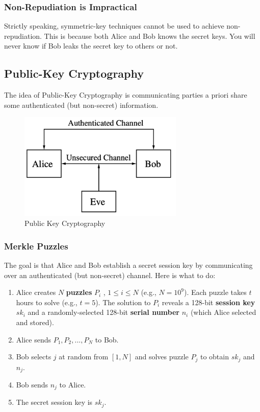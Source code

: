 \documentclass[12pt,titlepage]{article}
\begin{document}
\subsubsection{Non-Repudiation is Impractical}
Strictly speaking, symmetric-key techniques cannot be used to achieve non-repudiation. This is because both Alice and Bob knows the secret keys. You will never know if Bob leaks the secret key to others or not. 
\subsection{Public-Key Cryptography}
The idea of Public-Key Cryptography is communicating parties a priori share some authenticated (but non-secret) information.
\begin{center}
	\begin{figure}[h!]
		\centering
		\includegraphics[width=0.7\textwidth]{Public_Key_Cryptography.png}
		\caption{Public Key Cryptography}
	\end{figure}
\end{center}

\subsubsection{Merkle Puzzles}
The goal is that Alice and Bob establish a secret session key by communicating over an authenticated (but non-secret) channel. Here is what to do: \begin{enumerate}
	\item Alice creates $N$ \textbf{puzzles} $P_i$ , $1 \leq i \leq N$ (e.g., $N = 10^9$). Each puzzle takes $t$ hours to solve (e.g., $t = 5$). The solution to $P_i$ reveals a 128-bit \textbf{session key} $sk_i$ and a randomly-selected 128-bit \textbf{serial number} $n_i$ (which Alice selected and stored).
	\item Alice sends $P_1, P_2, ..., P_N$ to Bob.
	\item Bob selects $j$ at random from $[1, N]$ and solves puzzle $P_j$ to obtain $sk_j$ and $n_j$.
	\item Bob sends $n_j$ to Alice.
	\item The secret session key is $sk_j$.
\end{enumerate}
\end{document}
